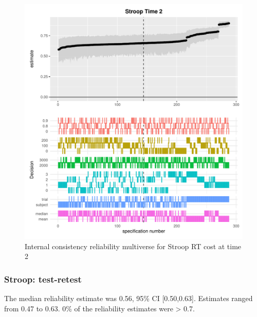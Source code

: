 \documentclass[
  english,
  man,floatsintext]{apa6}
\begin{document}
\begin{figure}
\centering
\includegraphics{Reliability_Multiverse_files/figure-latex/unnamed-chunk-6-1.pdf}
\caption{\label{fig:unnamed-chunk-6}Internal consistency reliability multiverse for Stroop RT cost at time 2}
\end{figure}

\newpage

\hypertarget{stroop-test-retest}{%
\subsubsection{Stroop: test-retest}\label{stroop-test-retest}}

The median reliability estimate was 0.56, 95\% CI {[}0.50,0.63{]}. Estimates ranged from 0.47 to 0.63. 0\% of the reliability estimates were \textgreater{} 0.7.
\end{document}

